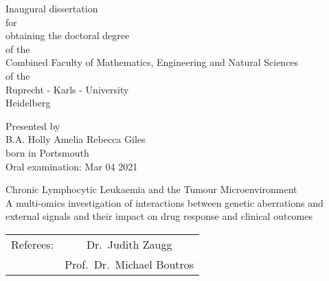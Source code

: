 \documentclass[11pt, a4paper, twosided]{book}
\begin{document}

\thispagestyle{empty}
  \begin{center}
  {\Large{Inaugural dissertation\\
    for\\
    obtaining the doctoral degree\\
    of the\\
    Combined Faculty of Mathematics, Engineering and Natural Sciences\\
    of the\\
    Ruprecht - Karls - University\\
    Heidelberg\\}} \vspace*{\fill}

  \Large{Presented by} \\\vspace{0.5cm}
  \Large{B.A. Holly Amelia Rebecca Giles} \\
  \Large{born in Portsmouth} \\
  \Large{Oral examination: Mar 04 2021}

\end{center}
\newpage\null\thispagestyle{empty}\newpage


\pagebreak
\thispagestyle{empty}
\null
\begin{center}
\Large{Chronic Lymphocytic Leukaemia and the Tumour Microenvironment} \\
\large{A multi-omics investigation of interactions between genetic aberrations and external signals and their impact on drug response and clinical outcomes} \\
\vspace*{\fill}
\begin{tabular}{ c c }
Referees: & Dr.~Judith Zaugg \\
          & Prof.~Dr.~Michael Boutros
\end{tabular}
\end{center}
\newpage\null\thispagestyle{empty}\newpage

\end{document}
